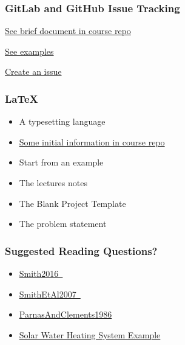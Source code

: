 \documentclass[t,12pt,numbers,fleqn]{beamer}
\begin{document}

\begin{frame}
\frametitle{GitLab and GitHub Issue Tracking}

\bi
\item \href{https://gitlab.cas.mcmaster.ca/smiths/cas741/tree/master/ToolTutorials/gitAndGitLab}{See brief document in course repo}
\item \href{https://github.com/JacquesCarette/literate-scientific-software/issues}{See
  examples}
\item \href{https://gitlab.cas.mcmaster.ca/smiths/cas741/issues}{Create an issue}
\ei

\end{frame}


\begin{frame}
\frametitle{LaTeX}
\begin{itemize}
\item A typesetting language
\item \href{https://gitlab.cas.mcmaster.ca/smiths/cas741/tree/master/ToolTutorials/LaTeX}{Some initial information in course repo}
\item Start from an example
\bi
\item The lectures notes
\item The Blank Project Template
\item The problem statement
\ei
\end{itemize}
\end{frame}


\begin{frame}
\frametitle{Suggested Reading Questions?}

\begin {itemize}

\item
  \href{https://gitlab.cas.mcmaster.ca/smiths/cas741/blob/master/ReferenceMaterial/SoftEngForScienceBook.pdf}
  {Smith2016~\cite{Smith2016}}
\item
  \href{https://gitlab.cas.mcmaster.ca/smiths/cas741/blob/master/ReferenceMaterial/SmithLaiAndKhedri2007fulltext.pdf}
  {SmithEtAl2007~\cite{SmithEtAl2007}}
\item
  \href{https://gitlab.cas.mcmaster.ca/smiths/cas741/blob/master/ReferenceMaterial/ParnasAndClements1986.pdf}
  {{ParnasAndClements1986}}
\item \href{https://github.com/smiths/swhs}{Solar Water Heating System Example}

\end{itemize}

\end{frame}
\end{document}
